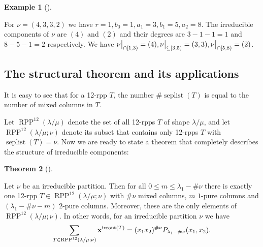 \documentclass[numbers=enddot,12pt,final,onecolumn,notitlepage]{scrartcl}%
\theoremstyle{definition}
\newtheorem{theo}{Theorem}[section]
\newenvironment{theorem}[1][]
{\begin{theo}[#1]\begin{leftbar}}
{\end{leftbar}\end{theo}}
\newtheorem{exmp}[theo]{Example}
\newenvironment{example}[1][]
{\begin{exmp}[#1]\begin{leftbar}}
{\end{leftbar}\end{exmp}}
\let\sumnonlimits\sum
\renewcommand{\sum}{\sumnonlimits\limits}
\def\seplist{{\operatorname*{seplist}}} %
\def\ircont{{\operatorname*{ircont}}}
\def\seplistvar{{{\nu}}} %
\def\lm{{\lambda/\mu}}
\def\OneTwoRPP{{\operatorname*{RPP}^{12}\left(  \lambda/\mu\right)}}
\def\OneTwoRPPCutvar{{\operatorname*{RPP}^{12}\left(  \lambda/\mu ;\seplistvar \right)}}
\begin{document}
\begin{example}
 For $\seplistvar=(4,3,3,2)$ we have $r=1,b_0=1,a_1=3,b_1=5,a_2=8$. The irreducible components of $\seplistvar$ are $(4)$ and $(2)$ and their degrees are $3-1-1=1$ and $8-5-1=2$ respectively. We have $\nuxycap{1}{3}=(4),\nuxy{3}{5}=(3,3),\nuxycap{5}{8}=(2)$.
\end{example}


\subsection{The structural theorem and its applications}
It is easy to see that for a 12-rpp $T$, the number $\#\seplist(T)$ is equal to the number of mixed columns in $T$.

Let $\OneTwoRPP$ denote the set of all 12-rpps $T$ of shape $\lm$, and let $\OneTwoRPPCutvar$ denote its subset that contains only 12-rpps $T$ with $\seplist(T)=\seplistvar$. Now we are ready to state a theorem that completely describes the structure of irreducible components:
\begin{theorem}
\label{thm:12rpps}
 Let $\seplistvar$ be an irreducible partition. Then for all $0\leq m\leq \lambda_1-\#\seplistvar$ there is exactly one 12-rpp $T\in\OneTwoRPPCutvar$ with $\#\seplistvar$ mixed columns, $m$ $1$-pure columns and $(\lambda_1-\#\seplistvar-m)$ $2$-pure columns. Moreover, these are the only elements of $\OneTwoRPPCutvar$. In other words, for an irreducible partition $\seplistvar$ we have
  \begin{equation}
 \label{eq:thm12rpps}
 \sum_{T\in\OneTwoRPPCutvar} \xx^{\ircont(T)}=(x_1x_2)^{\#\seplistvar} P_{\lambda_1-\#\seplistvar}(x_1,x_2).
 \end{equation}
\end{theorem}
\end{document}

